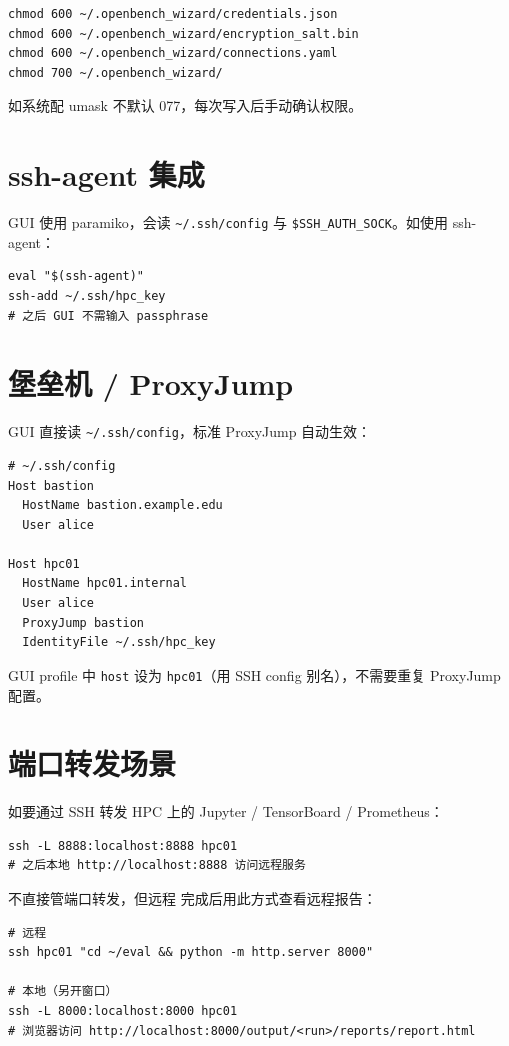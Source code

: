 \begin{verbatim}
chmod 600 ~/.openbench_wizard/credentials.json
chmod 600 ~/.openbench_wizard/encryption_salt.bin
chmod 600 ~/.openbench_wizard/connections.yaml
chmod 700 ~/.openbench_wizard/
\end{verbatim}

如系统配 umask 不默认 077，每次写入后手动确认权限。

\section{ssh-agent 集成}

\openbench{} GUI 使用 paramiko，会读 \texttt{\~{}/.ssh/config} 与 \texttt{\$SSH\_AUTH\_SOCK}。如使用 ssh-agent：

\begin{verbatim}
eval "$(ssh-agent)"
ssh-add ~/.ssh/hpc_key
# 之后 GUI 不需输入 passphrase
\end{verbatim}

\section{堡垒机 / ProxyJump}

\openbench{} GUI 直接读 \texttt{\~{}/.ssh/config}，标准 ProxyJump 自动生效：

\begin{verbatim}
# ~/.ssh/config
Host bastion
  HostName bastion.example.edu
  User alice

Host hpc01
  HostName hpc01.internal
  User alice
  ProxyJump bastion
  IdentityFile ~/.ssh/hpc_key
\end{verbatim}

GUI profile 中 \texttt{host} 设为 \texttt{hpc01}（用 SSH config 别名），不需要重复 ProxyJump 配置。

\section{端口转发场景}

如要通过 SSH 转发 HPC 上的 Jupyter / TensorBoard / Prometheus：

\begin{verbatim}
ssh -L 8888:localhost:8888 hpc01
# 之后本地 http://localhost:8888 访问远程服务
\end{verbatim}

\openbench{} 不直接管端口转发，但远程  完成后用此方式查看远程报告：

\begin{verbatim}
# 远程
ssh hpc01 "cd ~/eval && python -m http.server 8000"

# 本地（另开窗口）
ssh -L 8000:localhost:8000 hpc01
# 浏览器访问 http://localhost:8000/output/<run>/reports/report.html
\end{verbatim}

